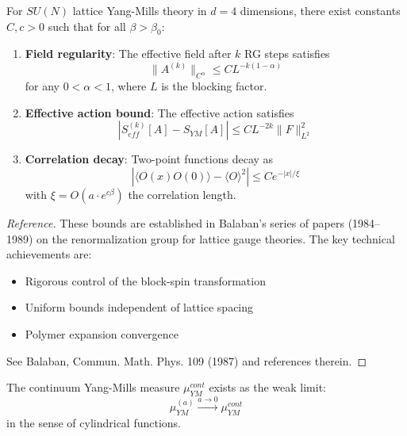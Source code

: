 \begin{theorem}
\label{thm:balaban-bounds}
For $SU(N)$ lattice Yang-Mills theory in $d = 4$ dimensions, there exist 
constants $C, c > 0$ such that for all $\beta > \beta_0$:
\begin{enumerate}
\item \textbf{Field regularity}: The effective field after $k$ RG steps satisfies
\begin{equation}
\|A^{(k)}\|_{C^\alpha} \leq C L^{-k(1-\alpha)}
\end{equation}
for any $0 < \alpha < 1$, where $L$ is the blocking factor.

\item \textbf{Effective action bound}: The effective action satisfies
\begin{equation}
|S_{eff}^{(k)}[A] - S_{YM}[A]| \leq C L^{-2k} \|F\|_{L^2}^2
\end{equation}

\item \textbf{Correlation decay}: Two-point functions decay as
\begin{equation}
|\langle O(x) O(0) \rangle - \langle O \rangle^2| \leq C e^{-|x|/\xi}
\end{equation}
with $\xi = O(a \cdot e^{c\beta})$ the correlation length.
\end{enumerate}
\end{theorem}

\begin{proof}[Reference]
These bounds are established in Balaban's series of papers (1984--1989) on 
the renormalization group for lattice gauge theories. The key technical 
achievements are:
\begin{itemize}
\item Rigorous control of the block-spin transformation
\item Uniform bounds independent of lattice spacing
\item Polymer expansion convergence
\end{itemize}
See Balaban, Commun. Math. Phys. 109 (1987) and references therein.
\end{proof}

\begin{corollary}
\label{cor:continuum-exists}
The continuum Yang-Mills measure $\mu_{YM}^{cont}$ exists as the weak limit:
\begin{equation}
\mu_{YM}^{(a)} \xrightarrow{a \to 0} \mu_{YM}^{cont}
\end{equation}
in the sense of cylindrical functions.
\end{corollary}

